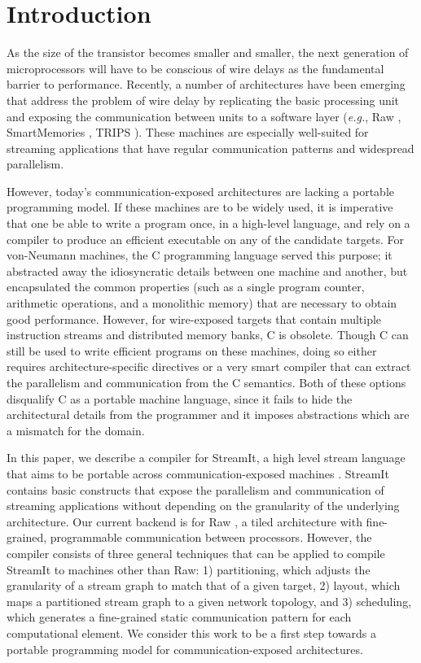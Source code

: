 \section{Introduction}

As the size of the transistor becomes smaller and smaller, the next
generation of microprocessors will have to be conscious of wire delays
as the fundamental barrier to performance.  Recently, a number of
architectures have been emerging that address the problem of wire
delay by replicating the basic processing unit and exposing the
communication between units to a software layer ({\it e.g.}, Raw
\cite{raw}, SmartMemories \cite{smartmemories}, TRIPS \cite{trips}).
These machines are especially well-suited for streaming applications
that have regular communication patterns and widespread parallelism.

However, today's communication-exposed architectures are lacking a
portable programming model.  If these machines are to be widely used,
it is imperative that one be able to write a program once, in a
high-level language, and rely on a compiler to produce an efficient
executable on any of the candidate targets. For von-Neumann machines,
the C programming language served this purpose; it abstracted away the
idiosyncratic details between one machine and another, but
encapsulated the common properties (such as a single program counter,
arithmetic operations, and a monolithic memory) that are necessary to
obtain good performance.  However, for wire-exposed targets that
contain multiple instruction streams and distributed memory banks, C
is obsolete.  Though C can still be used to write efficient programs
on these machines, doing so either requires architecture-specific
directives or a very smart compiler that can extract the parallelism
and communication from the C semantics.  Both of these options
disqualify C as a portable machine language, since it fails to hide
the architectural details from the programmer and it imposes
abstractions which are a mismatch for the domain.

In this paper, we describe a compiler for StreamIt, a high level
stream language that aims to be portable across communication-exposed
machines \cite{streamitcc}.  StreamIt contains basic constructs that
expose the parallelism and communication of streaming applications
without depending on the granularity of the underlying architecture.
Our current backend is for Raw \cite{raw}, a tiled architecture with
fine-grained, programmable communication between processors.  However,
the compiler consists of three general techniques that can be applied
to compile StreamIt to machines other than Raw: 1) partitioning, which
adjusts the granularity of a stream graph to match that of a given
target, 2) layout, which maps a partitioned stream graph to a given
network topology, and 3) scheduling, which generates a fine-grained
static communication pattern for each computational element.  We
consider this work to be a first step towards a portable programming
model for communication-exposed architectures.

